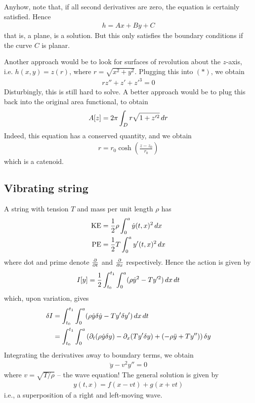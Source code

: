 \documentclass{../template/note}
\begin{document}
    Anyhow, note that, if all second derivatives are zero, the equation is certainly satisfied. Hence
    \begin{align*}
        h = Ax + By + C
    \end{align*}
    that is, a plane, is a solution. But this only satisfies the boundary conditions if the curve $C$ is planar.

    Another approach would be to look for surfaces of revolution about the $z$-axis, i.e. $h(x, y) = z(r)$, where $r = \sqrt{x^2+y^2}$. Plugging this into $(*)$, we obtain
    \begin{align*}
        rz'' + z' + z'^3 = 0
    \end{align*}
    Disturbingly, this is still hard to solve. A better approach would be to plug this back into the original area functional, to obtain
    \begin{align*}
        A[z] = 2\pi \int_D r\sqrt{1+z'^2} \,d{r}
    \end{align*}
    Indeed, this equation has a conserved quantity, and we obtain
    \begin{align*}
        r = r_0 \cosh \left(\frac{z-z_0}{r_0}\right)
    \end{align*}
    which is a catenoid.
    
    \subsection{Vibrating string}

    A string with tension $T$ and mass per unit length $\rho$ has
    \begin{align*}
        \mathrm{KE} &= \frac 1 2 \rho \int_0^a \dot y(t, x)^2 \,d{x} \\
        \mathrm{PE} &= \frac 1 2 T \int_0^a y'(t, x)^2 \,d{x}
    \end{align*}
    where dot and prime denote $\pd{}{t}$ and $\pd{}{x}$ respectively. Hence the action is given by
    \begin{align*}
        I[y] = \frac 1 2 \int_{t_0}^{t_1} \int_0^a (\rho \dot y^2 - Ty'^2) \,d{x} \,d{t}
    \end{align*}
    which, upon variation, gives
    \begin{align*}
        \delta I &= \int_{t_0}^{t_1} \int_0^a (\rho \dot y \delta \dot y - T y' \delta y') \,d{x} \,d{t} \\
        &= \int_{t_0}^{t_1} \int_0^a \left(\partial_t(\rho \dot y \delta y) - \partial_x (Ty' \delta y) + (-\rho \ddot y + Ty'')\right) \delta y
    \end{align*}
    Integrating the derivatives away to boundary terms, we obtain
    \begin{align*}
        \ddot y - v^2 y'' = 0
    \end{align*}
    where $v = \sqrt{T/\rho}$ -- the wave equation! The general solution is given by
    \begin{align*}
        y(t, x) = f(x - vt) + g(x + vt)
    \end{align*}
    i.e., a superposition of a right and left-moving wave. 
\end{document}
